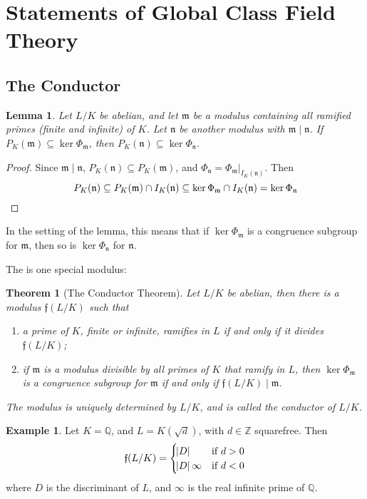 \documentclass[11pt]{article}
\theoremstyle{definition}
\newtheorem{example}[definition]{Example}
\theoremstyle{plain}
\newtheorem{theorem}[definition]{Theorem}
\newtheorem{lemma}[definition]{Lemma}
\theoremstyle{remark}
\newcommand{\ZZ}{\mathbb{Z}}
\newcommand{\QQ}{\mathbb{Q}}
\newcommand{\ff}{\mathfrak{f}}
\newcommand{\fm}{\mathfrak{m}}
\newcommand{\fn}{\mathfrak{n}}
\begin{document}
\section{Statements of Global Class Field Theory}

\subsection{The Conductor}

\begin{lemma}\label{lem:3_1}
    Let $L/K$ be abelian, and let $\fm$ be a modulus containing all ramified primes (finite and infinite) of $K$. Let $\fn$ be another modulus with $\fm \mid \fn$. If $P_K(\fm) \subseteq \ker \Phi_\fm$, then $P_K(\fn) \subseteq \ker \Phi_\fn$.
\end{lemma}
\begin{proof}
    Since $\fm \mid \fn$, $P_K(\fn) \subseteq P_K(\fm)$, and $\Phi_\fn = \Phi_\fm \vert_{I_K(\fn)}$. Then
    \begin{equation*}
        P_K(\fn) \subseteq P_K(\fm) \cap I_K(\fn) \subseteq \ker \Phi_\fm \cap I_K(\fn) = \ker \Phi_\fn \qedhere
    \end{equation*}
\end{proof}

\noindent In the setting of the lemma, this means that if $\ker \Phi_\fm$ is a congruence subgroup for $\fm$, then so is $\ker \Phi_\fn$ for $\fn$.

The is one special modulus:

\begin{theorem}[The Conductor Theorem]\label{thm:3_2}
    Let $L/K$ be abelian, then there is a modulus $\ff(L/K)$ such that
    \begin{enumerate}
        \item a prime of $K$, finite or infinite, ramifies in $L$ if and only if it divides $\ff(L/K)$;
        \item if $\fm$ is a modulus divisible by all primes of $K$ that ramify in $L$, then $\ker \Phi_\fm$ is a congruence subgroup for $\fm$ if and only if $\ff(L/K) \mid \fm$.
    \end{enumerate}
    The modulus is uniquely determined by $L/K$, and is called the \emph{conductor} of $L/K$.
\end{theorem}

\begin{example}\label{eg:3_3}
    Let $K = \QQ$, and $L = K(\sqrt{d})$, with $d \in \ZZ$ squarefree. Then
    \begin{equation*}
        \ff(L/K) =
        \begin{cases}
            \abs{D} & \text{if } d>0\\
            \abs{D}\infty & \text{if } d<0
        \end{cases}
    \end{equation*}
    where $D$ is the discriminant of $L$, and $\infty$ is the real infinite prime of $\QQ$. %
\end{example}
\end{document}
